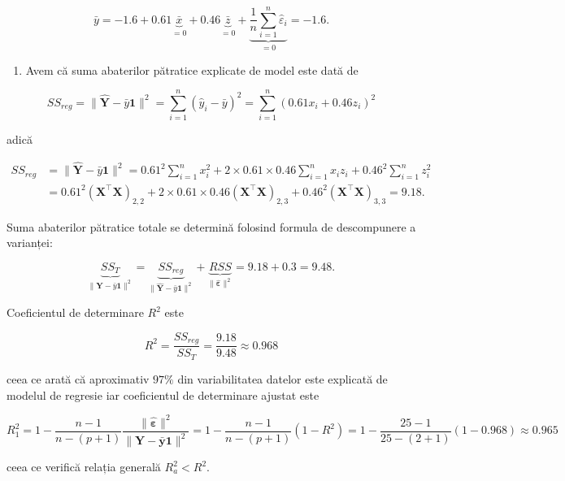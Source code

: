 \documentclass[]{article}
\providecommand{\tightlist}{%
  \setlength{\itemsep}{0pt}\setlength{\parskip}{0pt}}
\begin{document}
\[
  \bar y = -1.6 + 0.61 \underbrace{\bar x}_{=0} + 0.46 \underbrace{\bar z}_{= 0} + \underbrace{\frac{1}{n}\sum_{i=1}^{n}\hat{\varepsilon}_i}_{=0} = -1.6.
\]

\begin{enumerate}
\def\labelenumi{\alph{enumi})}
\setcounter{enumi}{1}
\tightlist
\item
  Avem că suma abaterilor pătratice explicate de model este dată de
\end{enumerate}

\[
  SS_{reg} = \lVert\hat{\boldsymbol Y} - \bar y\mathbf{1}\rVert^2 = \sum_{i=1}^{n}(\hat{y}_i - \bar y)^2 = \sum_{i=1}^{n}(0.61 x_i + 0.46 z_i)^2
\]

adică

\begin{align*}
  SS_{reg} &= \lVert\hat{\boldsymbol Y} - \bar y\mathbf{1}\rVert^2 = 0.61^2\sum_{i=1}^{n}x_i^2 + 2\times 0.61\times 0.46\sum_{i=1}^{n}x_iz_i + 0.46^2\sum_{i=1}^{n}z_i^2\\
  &= 0.61^2\left(\boldsymbol X^\intercal\boldsymbol X\right)_{2,2} + 2\times 0.61\times 0.46\left(\boldsymbol X^\intercal\boldsymbol X\right)_{2,3} + 0.46^2\left(\boldsymbol X^\intercal\boldsymbol X\right)_{3,3} = 9.18.
\end{align*}

Suma abaterilor pătratice totale se determină folosind formula de
descompunere a varianței:

\[
\underbrace{SS_T}_{\lVert\boldsymbol Y - \bar y\mathbf{1}\rVert^2} = \underbrace{SS_{reg}}_{\lVert\hat{\boldsymbol Y} - \bar y\mathbf{1}\rVert^2} + \underbrace{RSS}_{\lVert\hat{\boldsymbol \varepsilon}\rVert^2} = 9.18 + 0.3 = 9.48.
\]

Coeficientul de determinare \(R^2\) este

\[
  R^2 = \frac{SS_{reg}}{SS_T} = \frac{9.18}{9.48}\approx 0.968
\]

ceea ce arată că aproximativ \(97\%\) din variabilitatea datelor este
explicată de modelul de regresie iar coeficientul de determinare ajustat
este

\[
  R_1^2 = 1 - \frac{n-1}{n-(p+1)}\frac{\lVert\hat{\boldsymbol\varepsilon}\rVert^2}{\lVert \boldsymbol Y - \bar{\boldsymbol y}\mathbf{1}\rVert^2} = 1 - \frac{n-1}{n-(p+1)}\left(1 - R^2\right) = 1 - \frac{25 - 1}{25 - (2 + 1)}(1-0.968)\approx 0.965
\]

ceea ce verifică relația generală \(R_a^2<R^2\).
\end{document}
